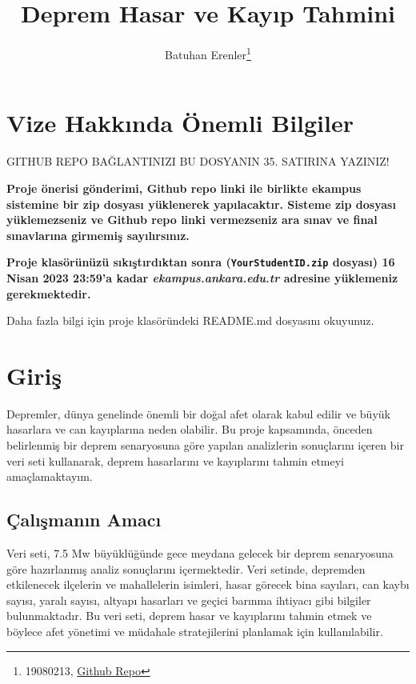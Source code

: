 \documentclass[
  12pt,
]{article}
\title{Deprem Hasar ve Kayıp Tahmini}
\author{Batuhan Erenler\footnote{19080213, \href{https://github.com/KULLANICI_ADINIZ/REPO_ADINIZ}{Github Repo}}}
\date{}
\begin{document}
\maketitle

\hypertarget{vize-hakkux131nda-uxf6nemli-bilgiler}{%
\section{Vize Hakkında Önemli Bilgiler}\label{vize-hakkux131nda-uxf6nemli-bilgiler}}

\colorbox{BurntOrange}{GITHUB REPO BAĞLANTINIZI BU DOSYANIN 35. SATIRINA YAZINIZ!}

\textbf{Proje önerisi gönderimi, Github repo linki ile birlikte ekampus sistemine bir zip dosyası yüklenerek yapılacaktır. Sisteme zip dosyası yüklemezseniz ve Github repo linki vermezseniz ara sınav ve final sınavlarına girmemiş sayılırsınız.}

\textbf{Proje klasörünüzü sıkıştırdıktan sonra (\texttt{YourStudentID.zip} dosyası) 16 Nisan 2023 23:59'a kadar \emph{ekampus.ankara.edu.tr} adresine yüklemeniz gerekmektedir.}

\colorbox{WildStrawberry}{Daha fazla bilgi için proje klasöründeki README.md dosyasını okuyunuz.}

\hypertarget{giriux15f}{%
\section{Giriş}\label{giriux15f}}

Depremler, dünya genelinde önemli bir doğal afet olarak kabul edilir ve büyük hasarlara ve can kayıplarına neden olabilir. Bu proje kapsamında, önceden belirlenmiş bir deprem senaryosuna göre yapılan analizlerin sonuçlarını içeren bir veri seti kullanarak, deprem hasarlarını ve kayıplarını tahmin etmeyi amaçlamaktayım.

\hypertarget{uxe7alux131ux15fmanux131n-amacux131}{%
\subsection{Çalışmanın Amacı}\label{uxe7alux131ux15fmanux131n-amacux131}}

Veri seti, 7.5 Mw büyüklüğünde gece meydana gelecek bir deprem senaryosuna göre hazırlanmış analiz sonuçlarını içermektedir. Veri setinde, depremden etkilenecek ilçelerin ve mahallelerin isimleri, hasar görecek bina sayıları, can kaybı sayısı, yaralı sayısı, altyapı hasarları ve geçici barınma ihtiyacı gibi bilgiler bulunmaktadır. Bu veri seti, deprem hasar ve kayıplarını tahmin etmek ve böylece afet yönetimi ve müdahale stratejilerini planlamak için kullanılabilir.
\end{document}
